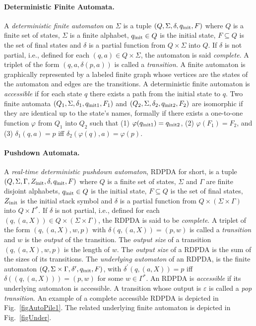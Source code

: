 \paragraph{Deterministic Finite Automata.}
A {\it deterministic finite automaton} on $\Sigma$ is a tuple
$(Q,\Sigma,\delta,q_{\rm init},F)$ where $Q$ is a finite set of states,
$\Sigma$ is a finite alphabet, $q_{\rm init}\in Q$ is the initial state,
$F\subseteq Q$ is the set of final states and $\delta$ is a partial function
from $Q\times\Sigma$ into $Q$. If $\delta$ is not partial, i.e., defined for
each $(q,a)\in Q\times\Sigma$, the automaton is said {\it complete}. A
triplet of the form $(q,a,\delta(p,a))$ is called a {\it transition}. A
finite automaton is graphically represented by a labeled finite graph whose
vertices are the states of the automaton and edges are the transitions. A
deterministic finite automaton is {\it accessible} if for each state $q$
there exists a path from the initial state to $q$. Two finite automata
$(Q_1,\Sigma,\delta_1,q_{\rm init1},F_1)$ and $(Q_2,\Sigma,\delta_2,q_{\rm
init2},F_2)$ are isomorphic if they are identical up to the state's names,
formally if there exists a one-to-one function $\varphi$ from $Q_1$ into
$Q_2$ such that (1) $\varphi(q_{\rm init1})=q_{\rm init2}$,  (2)
$\varphi(F_1)=F_2$, and (3) $\delta_1(q,a)=p$ iff
$\delta_2(\varphi(q),a)=\varphi(p)$.

\paragraph{Pushdown Automata.}
A {\it real-time deterministic pushdown automaton}, RDPDA for short, is a
tuple $(Q,\Sigma,\Gamma,Z_{\rm init},\delta,q_{\rm init},F)$ where $Q$ is a
finite set of states, $\Sigma$ and $\Gamma$ are finite disjoint alphabets,
$q_{\rm init}\in Q$ is the initial state, $F\subseteq Q$ is the set of final
states, $Z_{\rm init}$ is the initial stack symbol and $\delta$ is a partial
function from $Q\times(\Sigma\times\Gamma)$ into $Q\times\Gamma^*$. If
$\delta$ is not partial, i.e., defined for each $(q,(a,X))\in Q\times(\Sigma\times\Gamma)$, the
RDPDA is said to be {\it complete}. 
A triplet of the form $(q,(a,X),w,p)$ with
$\delta(q,(a,X))=(p,w)$ is called a {\it transition} and $w$ is the {\it
output} of the transition. The {\it output size} of a transition
$(q,(a,X),w,p)$ is the length of $w$.  The {\it output size} of
a RDPDA is the sum of the sizes of its transitions.
The {\it underlying automaton} of an
RDPDA, is the finite automaton $(Q,\Sigma\times\Gamma,\delta^\prime,q_{\rm
init},F)$, with $\delta^\prime(q,(a,X))=p$ iff $\delta((q,(a,X)))=(p,w)$
for some $w\in\Gamma^*$. An RDPDA is {\it accessible} if its underlying
automaton is accessible. A transition whose output is $\varepsilon$ is
called a {\it pop transition}. An example of a complete accessible RDPDA is
depicted in Fig.~\ref{figAutoPile1}. The related underlying  finite
automaton is depicted in Fig.~\ref{figUnder}.


